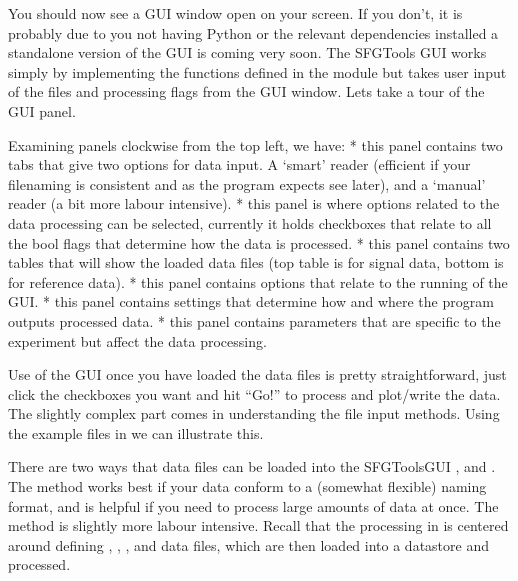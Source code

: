 \documentclass[a4paper,10pt,english]{sphinxmanual}
\begin{document}
\begin{sphinxVerbatim}[commandchars=\\\{\}]
 
\end{sphinxVerbatim}

\sphinxAtStartPar
You should now see a GUI window open on your screen. If you don’t, it is probably due to you not having Python or the relevant dependencies installed \sphinxhyphen{} a standalone  version of the GUI is coming very soon. The SFGTools GUI works simply by implementing the functions defined in the  module but takes user input of the files and processing flags from the GUI window. Lets take a tour of the GUI panel.

\sphinxAtStartPar
Examining panels clockwise from the top left, we have:
*  \sphinxhyphen{} this panel contains two tabs that give two options for data input. A ‘smart’ reader (efficient if your filenaming is consistent and as the program expects \sphinxhyphen{} see later), and a ‘manual’ reader (a bit more labour intensive).
*  \sphinxhyphen{} this panel is where options related to the data processing can be selected, currently it holds checkboxes that relate to all the bool flags that determine how the data is processed.
*  \sphinxhyphen{} this panel contains two tables that will show the loaded data files (top table is for signal data, bottom is for reference data).
*  \sphinxhyphen{} this panel contains options that relate to the running of the GUI.
*  \sphinxhyphen{} this panel contains settings that determine how and where the program outputs processed data.
*  \sphinxhyphen{} this panel contains parameters that are specific to the experiment but affect the data processing.

\sphinxAtStartPar
Use of the GUI once you have loaded the data files is pretty straightforward, just click the checkboxes you want and hit “Go!” to process and plot/write the data. The slightly complex part comes in understanding the file input methods. Using the example files in  we can illustrate this.

\sphinxAtStartPar
There are two ways that data files can be loaded into the SFGToolsGUI \sphinxhyphen{} , and . The  method works best if your data conform to a (somewhat flexible) naming format, and is helpful if you need to process large amounts of data at once. The  method is slightly more labour intensive. Recall that the processing in  is centered around defining , , , and  data files, which are then loaded into a datastore and processed.
\end{document}
